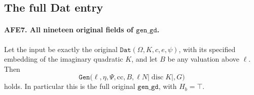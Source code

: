 \subsection{The full Dat entry}

\paragraph{AFE7. All nineteen original fields of \(\texttt{gen\_gd}\).}
\label{claim:AFE7}
Let the input be exactly the original
\(\texttt{Dat}(\Omega,K,c,e,\psi)\), with its specified
embedding of the imaginary quadratic \(K\), and let
\(B\) be any valuation above \(\ell\).
Then
\[
 \texttt{Gen}\bigl(\ell,\eta,\Psi,\mathrm{cc},B,
                     \ell N|\operatorname{disc}K|,G\bigr)
                                                        \tag{AFE.10}
\]
holds.  In particular this is the full original
\(\texttt{gen\_gd}\), with \(H_b=\top\).

